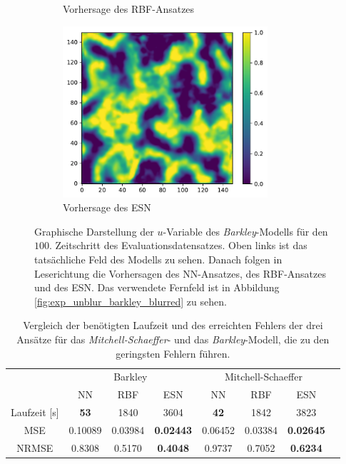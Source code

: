 \begin{figure}[h]
\begin{subfigure}{.5\textwidth}
		\setcapmargin[1cm]{0.5cm}
  		\caption{Vorhersage des \textsc{RBF}-Ansatzes}
  		\label{fig:exp_unblur_barkley_result_rbf_pred}
	\end{subfigure}%
	\begin{subfigure}{.5\textwidth}
		\centering
		\includegraphics[height=2.5in]{figures/results/unblur/esn_barkley_u_blur_pred.pdf}
		\setcapmargin[1cm]{0.5cm}
  		\caption{Vorhersage des \textsc{ESN}}
  		\label{fig:exp_unblur_barkley_result_esn_pred}
	\end{subfigure}
	\caption{Graphische Darstellung der $u$-Variable des \textit{Barkley}-Modells für den $100$. Zeitschritt des Evaluationsdatensatzes. Oben links ist das tatsächliche Feld des Modells zu sehen. Danach folgen in Leserichtung die Vorhersagen des \textsc{NN}-Ansatzes, des \textsc{RBF}-Ansatzes und des \textsc{ESN}. Das verwendete Fernfeld ist in Abbildung \ref{fig:exp_unblur_barkley_blurred} zu sehen. }
	\label{fig:exp_unblur_barkley_result}
\end{figure} 

\begin{table}[h]
	\centering
	\captionsetup{width=0.9\linewidth}
	\begin{tabular}{cccccccc}
		\hline
		\multicolumn{1}{c}{} & \multicolumn{3}{c}{Barkley} & \multicolumn{3}{c}{Mitchell-Schaeffer}		\\
		\multicolumn{1}{c}{} & NN & RBF & ESN & NN & RBF & ESN \\
		
		\hline
		
		Laufzeit [s] 	& \textbf{53} 	& 1840		& 3604				& \textbf{42}	& 1842 		& 3823 \\
		MSE 			& 0.10089		& 0.03984	& \textbf{0.02443} 	& 0.06452		& 0.03384 	& \textbf{0.02645} \\
		NRMSE 			& 0.8308		& 0.5170	& \textbf{0.4048} 	& 0.9737		& 0.7052 	& \textbf{0.6234} \\
		\hline 
	\end{tabular} 
	\caption{Vergleich der benötigten Laufzeit und des erreichten Fehlers der drei Ansätze für das \textit{Mitchell-Schaeffer}- und das \textit{Barkley}-Modell, die zu den geringsten Fehlern führen.}
	\label{tab:exp_unblur_comparison_results}
\end{table}

\FloatBarrier